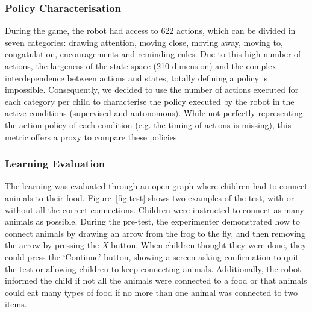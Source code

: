 \subsubsection{Policy Characterisation}

During the game, the robot had access to 622 actions, which can be divided in seven categories: drawing attention, moving close, moving away, moving to, congatulation, encouragements and reminding rules. Due to this high number of actions, the largeness of the state space (210 dimension) and the complex interdependence between actions and states, totally defining a policy is impossible. Consequently, we decided to use the number of actions executed for each category per child to characterise the policy executed by the robot in the active conditions (supervised and autonomous). While not perfectly representing the action policy of each condition (e.g. the timing of actions is missing), this metric offers a proxy to compare these policies. 

\subsubsection{Learning Evaluation}
The learning was evaluated through an open graph where children had to connect animals to their food. Figure~\ref{fig:test} shows two examples of the test, with or without all the correct connections. Children were instructed to connect as many animals as possible. During the pre-test, the experimenter demonstrated how to connect animals by drawing an arrow from the frog to the fly, and then removing the arrow by pressing the \textit{X} button. When children thought they were done, they could press the `Continue' button, showing a screen asking confirmation to quit the test or allowing children to keep connecting animals. Additionally, the robot informed the child if not all the animals were connected to a food or that animals could eat many types of food if no more than one animal was connected to two items. 

